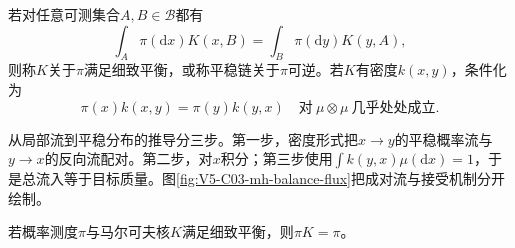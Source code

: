 \documentclass[UTF8,a4paper,11pt,openany]{ctexbook}
\begin{document}
\setcounter{page}{761}
\setcounter{chapter}{32}
\setcounter{figure}{3}
\pagestyle{headings}
\begin{definition}[细致平衡]
若对任意可测集合$A,B\in\mathcal B$都有
\begin{equation}
\int_A\pi(\mathrm dx)K(x,B)=\int_B\pi(\mathrm dy)K(y,A),
\end{equation}
则称$K$关于$\pi$满足细致平衡，或称平稳链关于$\pi$可逆。若$K$有密度$k(x,y)$，条件化为
\[
\pi(x)k(x,y)=\pi(y)k(y,x)\quad\text{对}\ \mu\otimes\mu\ \text{几乎处处成立}.
\]
\end{definition}
从局部流到平稳分布的推导分三步。第一步，密度形式把$x\to y$的平稳概率流与$y\to x$的反向流配对。第二步，对$x$积分；第三步使用$\int k(y,x)\mu(\mathrm dx)=1$，于是总流入等于目标质量。图\ref{fig:V5-C03-mh-balance-flux}把成对流与接受机制分开绘制。

\begin{proposition}[细致平衡推出平稳]
若概率测度$\pi$与马尔可夫核$K$满足细致平衡，则$\pi K=\pi$。
\end{proposition}
\end{document}
